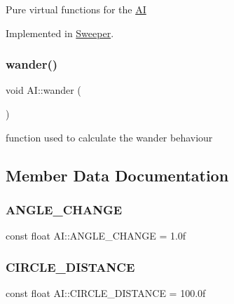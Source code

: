Pure virtual functions for the \mbox{\hyperlink{class_a_i}{AI}} 

Implemented in \mbox{\hyperlink{class_sweeper_aa186e2bb4c00d8f00c6a947cfd7b4a08}{Sweeper}}.

\mbox{\label{class_a_i_a3206d8de1de5e5171b81f2eecf5b1449}} 
\subsubsection{\texorpdfstring{wander()}{wander()}}
{\footnotesize\ttfamily void A\+I\+::wander (\begin{DoxyParamCaption}{ }\end{DoxyParamCaption})}

function used to calculate the wander behaviour 

\subsection{Member Data Documentation}
\mbox{\label{class_a_i_a2f93f21e5247247935f9375c56d2ea5e}} 
\subsubsection{\texorpdfstring{ANGLE\_CHANGE}{ANGLE\_CHANGE}}
{\footnotesize\ttfamily const float A\+I\+::\+A\+N\+G\+L\+E\+\_\+\+C\+H\+A\+N\+GE = 1.\+0f\hspace{0.3cm}{\ttfamily [protected]}}

\mbox{\label{class_a_i_ab5f7c13e87603201e56621a94175bcda}} 
\subsubsection{\texorpdfstring{CIRCLE\_DISTANCE}{CIRCLE\_DISTANCE}}
{\footnotesize\ttfamily const float A\+I\+::\+C\+I\+R\+C\+L\+E\+\_\+\+D\+I\+S\+T\+A\+N\+CE = 100.\+0f\hspace{0.3cm}{\ttfamily [protected]}}

\mbox{\label{class_a_i_a6e0782290618efecd32afee880be15b2}} 
